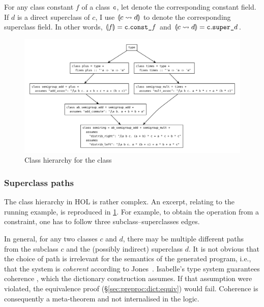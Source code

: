 For any class constant $f$ of a class $\texttt{\textup{c}}$, let  denote the corresponding constant field.
If $d$ is a direct superclass of $c$, I use $\llparenthesis c \leadsto d\rrparenthesis$ to denote the corresponding superclass field.
In other words, $\llparenthesis f\rrparenthesis = \texttt{\textup{c}}.\texttt{\textup{const\_}}f$ and $\llparenthesis c \leadsto d\rrparenthesis = \texttt{\textup{c}}.\texttt{\textup{super\_}}d$.%

\begin{figure}[t]
  \includegraphics[width=\linewidth]{img/class-deps.pdf}
  \caption{Class hierarchy for the  class}
  \label{fig:preproc:hierarchy}
\end{figure}

\subsubsection{Superclass paths}

The class hierarchy in HOL is rather complex.
An excerpt, relating to the running example, is reproduced in \cref{fig:preproc:hierarchy}.
For example, to obtain the  operation from a  constraint, one has to follow three subclass--superclasses edges.

In general, for any two classes $c$ and $d$, there may be multiple different paths from the subclass $c$ and the (possibly indirect) superclass $d$.
It is not obvious that the choice of path is irrelevant for the semantics of the generated program, i.e., that the system is \emph{coherent} according to Jones~\cite{jones1994types}. Isabelle's type system guarantees coherence \cite{nipkow1991typeclasses,nipkow1995reconstruction}, which the dictionary construction assumes.
If that assumption were violated, the equivalence proof (§\ref{sec:preproc:dict:equiv}) would fail.
Coherence is consequently a meta-theorem and not internalised in the logic.

